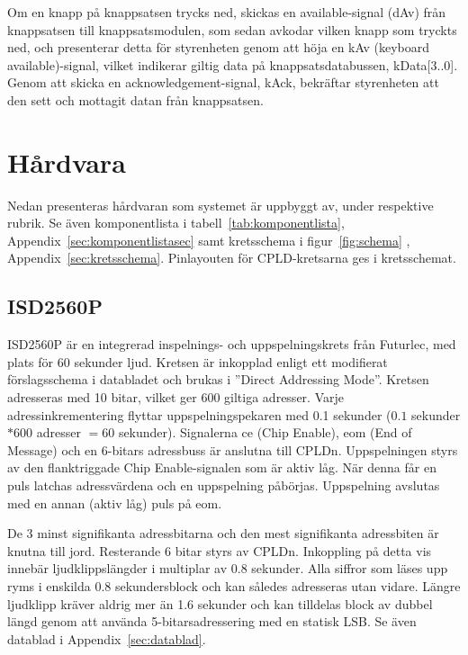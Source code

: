 \documentclass[a4paper,11pt]{article}
\begin{document}
Om en knapp på knappsatsen trycks ned, skickas en available-signal (dAv) från knappsatsen till knappsatsmodulen, som sedan
avkodar vilken knapp som tryckts ned, och presenterar detta för styrenheten genom att höja en kAv (keyboard available)-signal,
vilket indikerar giltig data på knappsatsdatabussen, kData[3..0]. Genom att skicka en acknowledgement-signal, kAck, bekräftar 
styrenheten att den sett och mottagit datan från knappsatsen.

\section{Hårdvara}

Nedan presenteras hårdvaran som systemet är uppbyggt av, under respektive rubrik. Se även komponentlista i tabell~\ref{tab:komponentlista}, Appendix~\ref{sec:komponentlistasec}
samt kretsschema i figur~\ref{fig:schema} , Appendix~\ref{sec:kretsschema}. Pinlayouten för CPLD-kretsarna ges i kretsschemat.

\label{hårdvara}
	\subsection{ISD2560P}
	\label{ISD2560P}
ISD2560P är en integrerad inspelnings- och uppspelningskrets från Futurlec, med plats för 60 sekunder ljud. Kretsen är inkopplad enligt ett modifierat förslagsschema i databladet och brukas i ''Direct Addressing Mode''. Kretsen adresseras med 10 bitar, vilket ger 600 giltiga adresser. Varje adressinkrementering flyttar uppspelningspekaren med 0.1 sekunder ($0.1 $ sekunder $* 600$ adresser $= 60$ sekunder). Signalerna ce (Chip Enable), eom (End of Message) och en 6-bitars adressbuss är anslutna till CPLDn. Uppspelningen styrs av den flanktriggade Chip Enable-signalen som är aktiv låg. När denna får en puls latchas adressvärdena och en uppspelning påbörjas. Uppspelning avslutas med en annan (aktiv låg) puls på eom.

De 3 minst signifikanta adressbitarna och den mest signifikanta adressbiten är knutna till jord. Resterande 6 bitar styrs av CPLDn. Inkoppling på detta vis innebär ljudklippslängder i multiplar av 0.8 sekunder. Alla siffror som läses upp ryms i enskilda 0.8 sekundersblock och kan således adresseras utan vidare. Längre ljudklipp kräver aldrig mer än 1.6 sekunder och kan tilldelas block av dubbel längd genom att använda 5-bitarsadressering med en statisk LSB.
	Se även datablad i Appendix~\ref{sec:datablad}.
\end{document}
